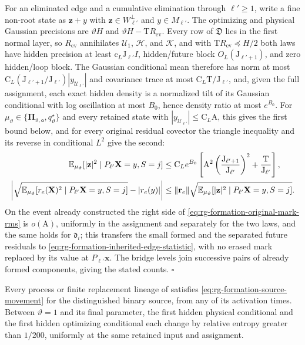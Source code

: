 For an eliminated edge and a cumulative elimination through \(\ell'\ge1\),
write a fine non-root state as \(\mathbf z+y\) with
\(\mathbf z\in W_{\ell'}^\perp\) and \(y\in M_{\ell'}\). The optimizing and
physical Gaussian precisions are \(\vartheta H\) and
\(\vartheta H-\mathrm TR_{\mathrm{ev}}\). Every row of \(\mathfrak D\) lies in the
first normal layer, so \(R_{\mathrm{ev}}\) annihilates \(\mathcal U_1\),
\(\mathcal H\), and \(\mathcal K\), and with \(\mathrm TR_{\mathrm{ev}}\preceq H/2\)
both laws have hidden precision at least \(\mathrm c_L\mathrm J_{\ell'}I\),
hidden/future block \(O_L(\mathrm J_{\ell'+1})\), and zero hidden/loop block.
The Gaussian conditional mean therefore has norm at most
\(\mathrm C_L(\mathrm J_{\ell'+1}/\mathrm J_{\ell'})|y_{\mathcal U_{\ell'}}|\) and
covariance trace at most \(\mathrm C_L\mathrm T/\mathrm J_{\ell'}\), and, given
the full assignment, each exact hidden density is a normalized tilt of its
Gaussian conditional with log oscillation at most \(B_0\), hence density ratio
at most \(e^{B_0}\). For
\(\mu_\vartheta\in\{\boldsymbol\Pi_{\vartheta,\mathsf o},q^\star_\vartheta\}\) and
every retained state with \(|y_{\mathcal U_{\ell'}}|\le\mathrm C_L\mathrm A\), this
gives the first bound below, and for every original residual covector the
triangle inequality and its reverse in conditional \(L^2\) give the second:
\begin{align}
 \mathbb E_{\mu_\vartheta}
   [|\mathbf z|^2\mid P_{\ell'}\mathbf X=y,S=j]
 &\le \mathrm C_Le^{B_0}\left[
       \mathrm A^2\left(\frac{\mathrm J_{\ell'+1}}{\mathrm J_{\ell'}}\right)^2
       +\frac{\mathrm T}{\mathrm J_{\ell'}}\right],
 \label{eq:rg-formation-hidden-original-mark-moment}\\
 \left|
 \sqrt{\mathbb E_{\mu_\vartheta}[r_e(\mathbf X)^2\mid P_{\ell'}\mathbf X=y,S=j]}
 -|r_e(y)|\right|
 &\le\|\mathbf r_e\|
      \sqrt{\mathbb E_{\mu_\vartheta}[|\mathbf z|^2\mid P_{\ell'}\mathbf X=y,S=j]}.
 \label{eq:rg-formation-original-mark-rms}
\end{align}
On the event already constructed the right side of
\cref{eq:rg-formation-original-mark-rms} is \(o(\mathrm A)\), uniformly in the
assignment and separately for the two laws, and the same holds for
\(\mathfrak d_i\); this transfers the small formed and the separated future
residuals to \cref{eq:rg-formation-inherited-edge-statistic}, with no erased
mark replaced by its value at \(P_{\ell'}\mathbf x\). The bridge levels join
successive pairs of already formed components, giving the stated counts.
\hfill\(\square\)

Every process or finite replacement lineage of
 satisfies
\cref{eq:rg-formation-source-movement} for the distinguished binary source,
from any of its activation times. Between \(\vartheta=1\) and its final
parameter, the first hidden physical conditional and the first hidden
optimizing conditional each change by relative entropy greater than
\(1/200\), uniformly at the same retained input and assignment.


